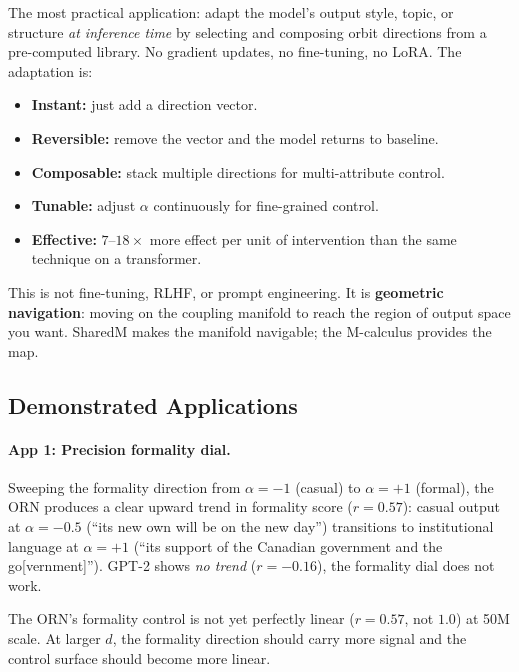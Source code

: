 \documentclass[11pt, a4paper]{article}
\theoremstyle{plain}
\theoremstyle{definition}
\theoremstyle{remark}
\begin{document}
The most practical application: adapt the model's output style, topic, or structure \emph{at inference time} by selecting and composing orbit directions from a pre-computed library.
No gradient updates, no fine-tuning, no LoRA.
The adaptation is:
\begin{itemize}[nosep]
\item \textbf{Instant:} just add a direction vector.
\item \textbf{Reversible:} remove the vector and the model returns to baseline.
\item \textbf{Composable:} stack multiple directions for multi-attribute control.
\item \textbf{Tunable:} adjust $\alpha$ continuously for fine-grained control.
\item \textbf{Effective:} $7$--$18\times$ more effect per unit of intervention than the same technique on a transformer.
\end{itemize}

This is not fine-tuning, RLHF, or prompt engineering.
It is \textbf{geometric navigation}: moving on the coupling manifold to reach the region of output space you want.
SharedM makes the manifold navigable; the M-calculus provides the map.

\subsection{Demonstrated Applications}

\paragraph{App 1: Precision formality dial.}
Sweeping the formality direction from $\alpha{=}{-1}$ (casual) to $\alpha{=}{+1}$ (formal), the ORN produces a clear upward trend in formality score ($r{=}0.57$): casual output at $\alpha{=}{-0.5}$ (``its new own will be on the new day'') transitions to institutional language at $\alpha{=}{+1}$ (``its support of the Canadian government and the go[vernment]'').
GPT-2 shows \emph{no trend} ($r{=}{-0.16}$), the formality dial does not work.

The ORN's formality control is not yet perfectly linear ($r{=}0.57$, not $1.0$) at 50M scale.
At larger $d$, the formality direction should carry more signal and the control surface should become more linear.
\end{document}
